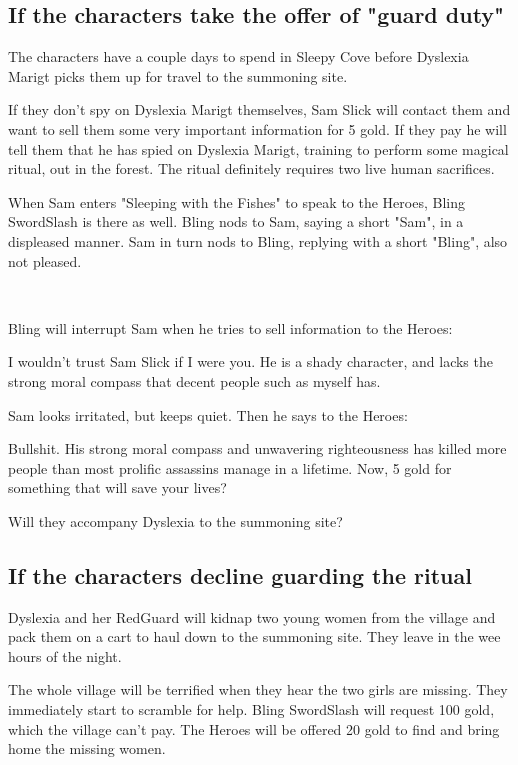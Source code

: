 \subsection*{If the characters take the offer of "guard duty"}
The characters have a couple days to spend in Sleepy Cove before Dyslexia Marigt picks them up for travel to the summoning site.

If they don't spy on Dyslexia Marigt themselves, Sam Slick will contact them and want to sell them some very important information for 5 gold. If they pay he will tell them that he has spied on Dyslexia Marigt, training to perform some magical ritual, out in the forest. The ritual definitely requires two live human sacrifices.

When Sam enters "Sleeping with the Fishes" to speak to the Heroes, Bling SwordSlash is there as well. Bling nods to Sam, saying a short "Sam", in a displeased manner. Sam in turn nods to Bling, replying with a short "Bling", also not pleased.

\

\noindent Bling will interrupt Sam when he tries to sell information to the Heroes:
\begin{readoutloud}
I wouldn't trust Sam Slick if I were you. He is a shady character, and lacks the strong moral compass that decent people such as myself has.
\end{readoutloud}
Sam looks irritated, but keeps quiet. Then he says to the Heroes:
\begin{readoutloud}
Bullshit. His strong moral compass and unwavering righteousness has killed more people than most prolific assassins manage in a lifetime. Now, 5 gold for something that will save your lives?
\end{readoutloud}

Will they accompany Dyslexia to the summoning site?


\subsection*{If the characters decline guarding the ritual}
Dyslexia and her RedGuard will kidnap two young women from the village and pack them on a cart to haul down to the summoning site. They leave in the wee hours of the night.

The whole village will be terrified when they hear the two girls are missing. They immediately start to scramble for help. Bling SwordSlash will request 100 gold, which the village can't pay. The Heroes will be offered 20 gold to find and bring home the missing women.

